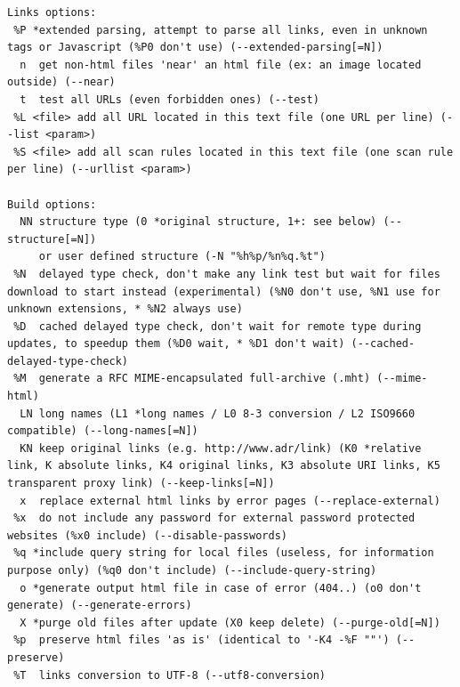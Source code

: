 \documentclass{article}
\begin{document}
\begin{lstlisting}
Links options:
 %P *extended parsing, attempt to parse all links, even in unknown tags or Javascript (%P0 don't use) (--extended-parsing[=N])
  n  get non-html files 'near' an html file (ex: an image located outside) (--near)
  t  test all URLs (even forbidden ones) (--test)
 %L <file> add all URL located in this text file (one URL per line) (--list <param>)
 %S <file> add all scan rules located in this text file (one scan rule per line) (--urllist <param>)

Build options:
  NN structure type (0 *original structure, 1+: see below) (--structure[=N])
     or user defined structure (-N "%h%p/%n%q.%t")
 %N  delayed type check, don't make any link test but wait for files download to start instead (experimental) (%N0 don't use, %N1 use for unknown extensions, * %N2 always use)
 %D  cached delayed type check, don't wait for remote type during updates, to speedup them (%D0 wait, * %D1 don't wait) (--cached-delayed-type-check)
 %M  generate a RFC MIME-encapsulated full-archive (.mht) (--mime-html)
  LN long names (L1 *long names / L0 8-3 conversion / L2 ISO9660 compatible) (--long-names[=N])
  KN keep original links (e.g. http://www.adr/link) (K0 *relative link, K absolute links, K4 original links, K3 absolute URI links, K5 transparent proxy link) (--keep-links[=N])
  x  replace external html links by error pages (--replace-external)
 %x  do not include any password for external password protected websites (%x0 include) (--disable-passwords)
 %q *include query string for local files (useless, for information purpose only) (%q0 don't include) (--include-query-string)
  o *generate output html file in case of error (404..) (o0 don't generate) (--generate-errors)
  X *purge old files after update (X0 keep delete) (--purge-old[=N])
 %p  preserve html files 'as is' (identical to '-K4 -%F ""') (--preserve)
 %T  links conversion to UTF-8 (--utf8-conversion)


\end{lstlisting}
\end{document}
